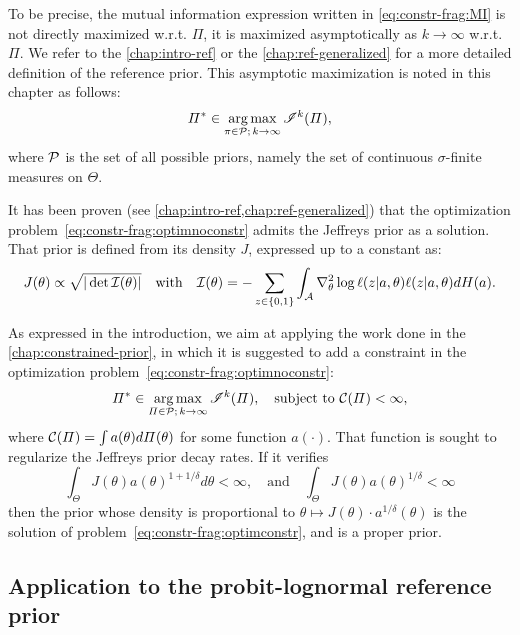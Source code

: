 To be precise, the mutual information expression written in \cref{eq:constr-frag:MI} is not directly maximized w.r.t. $\varPi$, it is maximized asymptotically as $k\rightarrow\infty$ w.r.t. $\varPi$. We refer to the \cref{chap:intro-ref} or the \cref{chap:ref-generalized} for a more detailed definition of the reference prior. This asymptotic maximization is noted in this chapter as follows:
\begin{equation}\label{eq:constr-frag:optimnoconstr}
    \varPi^\ast\in\operatorname*{arg\,max}_{\pi\in\mathcal{P};\,k\rightarrow\infty}\mathscr{I}^k(\varPi),
\end{equation}
where $\mathcal{P}$ is the set of all possible priors, namely the set of continuous $\sigma$-finite measures on $\Theta$.

It has been proven (see \cref{chap:intro-ref,chap:ref-generalized}) that the optimization problem~\eqref{eq:constr-frag:optimnoconstr} admits the Jeffreys prior as a solution. That prior is defined from its density $J$, expressed up to a constant as:
    \begin{equation}
        J(\theta)\propto\sqrt{|\det\mathcal{I}(\theta)|}\quad\text{with}\quad \mathcal{I}(\theta) = -\sum_{z\in\{0,1\}}\int_{\mathcal{A}}\nabla_\theta^2\log\ell(z|a,\theta) \ell(z|a,\theta)dH(a).
    \end{equation}

As expressed in the introduction, we aim at applying the work done in the \cref{chap:constrained-prior}, in which it is suggested to add a constraint in the optimization problem~\eqref{eq:constr-frag:optimnoconstr}:
\begin{equation}\label{eq:constr-frag:optimconstr}
    \varPi^\ast\in\operatorname*{arg\,max}_{\varPi\in\mathcal{P};\,k\rightarrow\infty}\mathscr{I}^k(\varPi),\quad\text{subject to\ }\mathcal{C}(\varPi)<\infty,
\end{equation}
where $\mathcal{C}(\varPi)= \int a(\theta)d\varPi(\theta)$ for some function $a(\cdot)$.
That function is sought to regularize the Jeffreys prior decay rates. If it verifies
    \begin{equation}\label{eq:constr-frag:inta}
        \int_\Theta J(\theta)a(\theta)^{1+1/\delta}d\theta <\infty, \quad\text{and} \quad \int_\Theta J(\theta)a(\theta)^{1/\delta}<\infty 
    \end{equation}
then the prior whose density is proportional to $\theta\mapsto J(\theta)\cdot a^{1/\delta}(\theta)$ is the solution of problem~\eqref{eq:constr-frag:optimconstr}, and is a proper prior.


\subsection{Application to the probit-lognormal reference prior}\label{sec:constr-frags:subsec-constr-in-probit}


